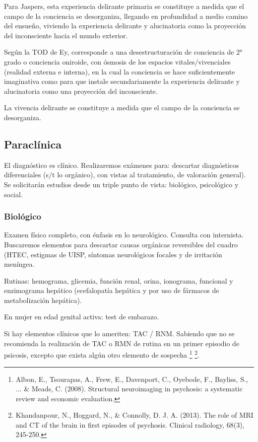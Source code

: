 \documentclass{scrbook}
\begin{document}
Para Jaspers, esta experiencia delirante primaria se constituye a medida que el campo de la conciencia se desorganiza, llegando en profundidad a medio camino del ensueño, viviendo la experiencia delirante y alucinatoria como la proyección del inconsciente hacia el mundo exterior.

Según la TOD de Ey, corresponde a una desestructuración de conciencia de 2° grado o conciencia oniroide, con ósmosis de los espacios vitales/vivenciales (realidad externa e interna), en la cual la conciencia se hace suficientemente imaginativa como para que instale secundariamente la experiencia delirante y alucinatoria como una proyección del inconsciente.

La vivencia delirante se constituye a medida que el campo de la conciencia se desorganiza.
\subsection*{Paraclínica}
El diagnóstico es clínico. Realizaremos exámenes para: descartar diagnósticos diferenciales (s/t lo orgánico), con vistas al tratamiento, de valoración general). Se solicitarán estudios desde un triple punto de vista: biológico, psicológico y social.
\subsubsection*{Biológico}
Examen físico completo, con énfasis en lo neurológico. Consulta con internista. Buscaremos elementos para descartar causas orgánicas reversibles del cuadro (HTEC, estigmas de UISP, síntomas neurológicos focales y de irritación meníngea.

Rutinas: hemograma, glicemia, función renal, orina, ionograma, funcional y enzimograma hepático (ecefalopatía hepática y por uso de fármacos de metabolización hepática).

En mujer en edad genital activa: test de embarazo.

Si hay elementos clínicos que lo ameriten: TAC / RNM. Sabiendo que no se recomienda la realización de TAC o RMN de rutina en un primer episodio de psicosis, excepto que exista algún otro elemento de sospecha \footnote{Albon, E., Tsourapas, A., Frew, E., Davenport, C., Oyebode, F., Bayliss, S., ... \& Meads, C. (2008). Structural neuroimaging in psychosis: a systematic review and economic evaluation.} \footnote{Khandanpour, N., Hoggard, N., \& Connolly, D. J. A. (2013). The role of MRI and CT of the brain in first episodes of psychosis. Clinical radiology, 68(3), 245-250.}.
\end{document}
